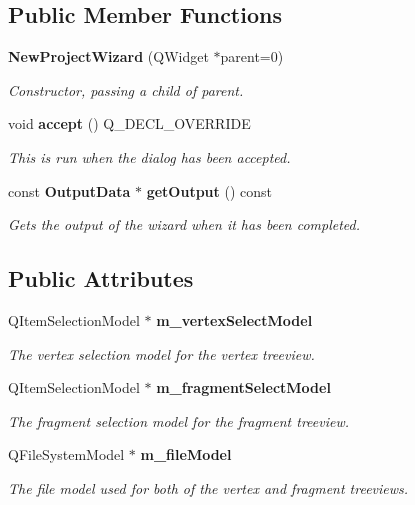 \subsection*{Public Member Functions}
\begin{DoxyCompactItemize}
\item 
{\bf New\-Project\-Wizard} (Q\-Widget $\ast$parent=0)
\begin{DoxyCompactList}\small\item\em Constructor, passing a child of parent. \end{DoxyCompactList}\item 
void {\bf accept} () Q\-\_\-\-D\-E\-C\-L\-\_\-\-O\-V\-E\-R\-R\-I\-D\-E
\begin{DoxyCompactList}\small\item\em This is run when the dialog has been accepted. \end{DoxyCompactList}\item 
const {\bf Output\-Data} $\ast$ {\bf get\-Output} () const 
\begin{DoxyCompactList}\small\item\em Gets the output of the wizard when it has been completed. \end{DoxyCompactList}\end{DoxyCompactItemize}
\subsection*{Public Attributes}
\begin{DoxyCompactItemize}
\item 
Q\-Item\-Selection\-Model $\ast$ {\bf m\-\_\-vertex\-Select\-Model}
\begin{DoxyCompactList}\small\item\em The vertex selection model for the vertex treeview. \end{DoxyCompactList}\item 
Q\-Item\-Selection\-Model $\ast$ {\bf m\-\_\-fragment\-Select\-Model}
\begin{DoxyCompactList}\small\item\em The fragment selection model for the fragment treeview. \end{DoxyCompactList}\item 
Q\-File\-System\-Model $\ast$ {\bf m\-\_\-file\-Model}
\begin{DoxyCompactList}\small\item\em The file model used for both of the vertex and fragment treeviews. \end{DoxyCompactList}\end{DoxyCompactItemize}
